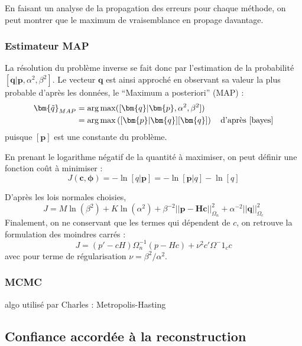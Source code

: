 En faisant un analyse de la propagation des erreurs pour chaque méthode, on peut montrer que le maximum de vraisemblance en propage davantage.\\

\subsubsection{Estimateur MAP}
La résolution du problème inverse se fait donc par l'estimation de la probabilité $[\bm{q}|\bm{p},\alpha^2,\beta^2]$. Le vecteur $\bm{q}$ est ainsi approché en observant sa valeur la plus probable d'après les données, le  ``Maximum a posteriori'' (MAP) : 
\begin{align}
\bm{\tilde{q}}_{MAP} &= \arg\max([\bm{q}|\bm{p},\alpha^2,\beta^2])\\
					 &= \arg\max\left( [\bm{p}|\bm{q}][\bm{q}]  \right) ~~~\text{d'après \ref{bayes}}
\end{align}
puisque $[\bm{p}]$ est une constante du problème.

En prenant le logarithme négatif de la quantité à maximiser, on peut définir une fonction coût à minimiser : 
\begin{equation}
	J(\bm{c},\bm{\phi}) = - \ln[q|\bm{p}] = -\ln[\bm{p}|q]-\ln[q]
\end{equation}

D'après les lois normales choisies, 
\begin{equation}
J=M\ln(\beta^2) + K\ln(\alpha^2) +\beta^{-2}||\bm{p}-\bm{Hc}||^2_{\Omega_n}+\alpha^{-2}||\bm{q}||^2_{\Omega_c}
\end{equation}
Finalement, on ne conservant que les termes qui dépendent de $c$, on retrouve la formulation des moindres carrés : 
\begin{equation}
 J = (p'-cH)\Omega^{-1}_n(p-Hc) + \nu^2c'\Omega^-1_c c
\end{equation}
avec pour terme de régularisation $\nu = \beta^2/\alpha^2$.





\subsubsection{MCMC}
algo utilisé par Charles : Metropolis-Hasting


\subsection{Confiance accordée à la reconstruction}

	
